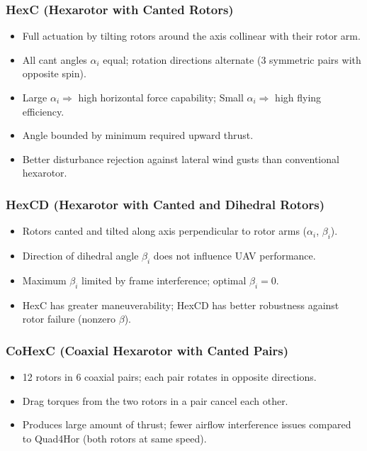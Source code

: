 \documentclass[11pt,a4paper]{article}
\begin{document}
\subsubsection*{HexC (Hexarotor with Canted Rotors)}
\begin{itemize}
  \item Full actuation by tilting rotors around the axis collinear with their rotor arm.
  \item All cant angles $\alpha_i$ equal; rotation directions alternate (3 symmetric pairs with opposite spin).
  \item Large $\alpha_i \Rightarrow$ high horizontal force capability; Small $\alpha_i \Rightarrow$ high flying efficiency.
  \item Angle bounded by minimum required upward thrust.
  \item Better disturbance rejection against lateral wind gusts than conventional hexarotor.
\end{itemize}

\subsubsection*{HexCD (Hexarotor with Canted and Dihedral Rotors)}
\begin{itemize}
  \item Rotors canted and tilted along axis perpendicular to rotor arms ($\alpha_i$, $\beta_i$).
  \item Direction of dihedral angle $\beta_i$ does not influence UAV performance.
  \item Maximum $\beta_i$ limited by frame interference; optimal $\beta_i = 0$.
  \item HexC has greater maneuverability; HexCD has better robustness against rotor failure (nonzero $\beta$).
\end{itemize}

\subsubsection*{CoHexC (Coaxial Hexarotor with Canted Pairs)}
\begin{itemize}
  \item 12 rotors in 6 coaxial pairs; each pair rotates in opposite directions.
  \item Drag torques from the two rotors in a pair cancel each other.
  \item Produces large amount of thrust; fewer airflow interference issues compared to Quad4Hor (both rotors at same speed).
\end{itemize}
\end{document}
